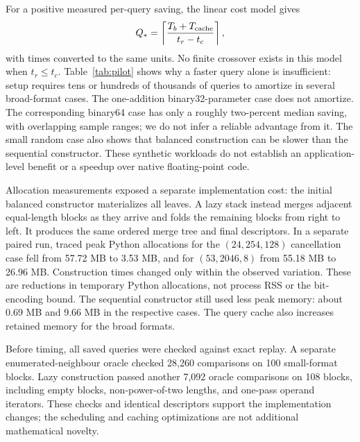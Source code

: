 For a positive measured per-query saving, the linear cost model gives
\[
 Q_\ast=\left\lceil\frac{T_b+T_{\rm cache}}{t_r-t_c}\right\rceil,
\]
with times converted to the same units. No finite crossover exists in
this model when $t_r\leq t_c$. Table~\ref{tab:pilot} shows why a faster
query alone is insufficient: setup requires tens or hundreds of thousands
of queries to amortize in several broad-format cases. The one-addition
binary32-parameter case does not amortize. The corresponding binary64
case has only a roughly two-percent median saving, with overlapping
sample ranges; we do not infer a reliable advantage from it. The small
random case also shows that balanced construction can be slower than
the sequential constructor. These synthetic workloads do not establish
an application-level benefit or a speedup over native floating-point code.

Allocation measurements exposed a separate implementation cost: the
initial balanced constructor materializes all leaves. A lazy stack
instead merges adjacent equal-length blocks as they arrive and folds
the remaining blocks from right to left. It produces the same ordered
merge tree and final descriptors. In a separate paired run, traced peak
Python allocations for the $(24,254,128)$ cancellation case fell from
57.72 MB to 3.53 MB, and for $(53,2046,8)$ from 55.18 MB to 26.96 MB.
Construction times changed only within the observed variation. These
are reductions in temporary Python allocations, not process RSS or the
bit-encoding bound. The sequential constructor still used less peak
memory: about 0.69 MB and 9.66 MB in the respective cases. The query cache
also increases retained memory for the broad formats.

Before timing, all saved queries were checked against exact replay.
A separate enumerated-neighbour oracle checked 28,260 comparisons on
100 small-format blocks. Lazy construction passed another 7,092 oracle
comparisons on 108 blocks, including empty blocks, non-power-of-two
lengths, and one-pass operand iterators. These checks and identical
descriptors support the implementation changes; the scheduling and
caching optimizations are not additional mathematical novelty.

